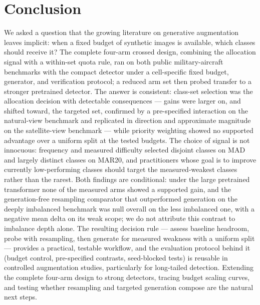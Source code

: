 \documentclass[preprint,12pt,authoryear]{elsarticle}
\begin{document}
\section{Conclusion}\label{sec:conclusion}

We asked a question that the growing literature on generative
augmentation leaves implicit: when a fixed budget of synthetic images is
available, which classes should receive it? The complete four-arm crossed design, combining the allocation signal
with a within-set quota rule, ran on both public military-aircraft
benchmarks with the compact detector under a cell-specific fixed
budget, generator, and verification protocol; a reduced arm set then
probed transfer to a stronger pretrained detector. The answer is
consistent: class-set selection was the allocation decision with
detectable consequences --- gains were larger on, and shifted toward,
the targeted set, confirmed by a pre-specified interaction on the
natural-view benchmark and replicated in direction and approximate
magnitude on the satellite-view benchmark --- while priority weighting
showed no supported advantage over a uniform split at the tested
budgets. The choice of signal is not innocuous: frequency and measured
difficulty selected disjoint classes on MAD and largely distinct
classes on MAR20, and practitioners whose goal is to improve currently
low-performing classes should target the measured-weakest classes
rather than the rarest. Both findings are conditional: under the large
pretrained transformer none of the measured arms showed a supported
gain, and the generation-free resampling comparator that outperformed
generation on the deeply imbalanced benchmark was null overall on the
less imbalanced one, with a negative mean delta on its weak scope; we
do not attribute this contrast to imbalance depth alone. The resulting
decision rule --- assess baseline headroom, probe with resampling, then
generate for measured weakness with a uniform split --- provides a
practical, testable workflow, and the evaluation protocol behind it
(budget control, pre-specified contrasts, seed-blocked tests) is
reusable in controlled augmentation studies, particularly for
long-tailed detection. Extending the complete four-arm
design to strong detectors, tracing budget scaling curves, and testing
whether resampling and targeted generation compose are the natural next
steps.

\end{document}
